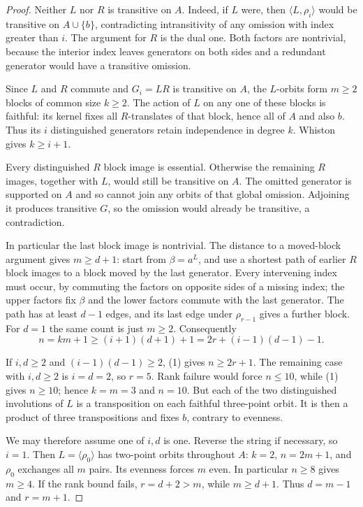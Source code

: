 \documentclass[11pt,a4paper]{article}
\newcommand{\gen}[1]{\langle#1\rangle}
\begin{document}
\begin{proof}
Neither $L$ nor $R$ is transitive on $A$. Indeed, if $L$ were,
then $\gen{L,\rho_i}$ would be transitive on $A\cup\{b\}$,
contradicting intransitivity of any omission with index greater
than $i$. The argument for $R$ is the dual one. Both factors
are nontrivial, because the interior index leaves generators
on both sides and a redundant generator would have a transitive
omission.

Since $L$ and $R$ commute and $G_i=LR$ is transitive on $A$,
the $L$-orbits form $m\geq2$ blocks of common size $k\geq2$.
The action of $L$ on any one of these blocks is faithful: its
kernel fixes all $R$-translates of that block, hence all of $A$
and also $b$. Thus its $i$ distinguished generators retain
independence in degree $k$. Whiston gives $k\geq i+1$.

Every distinguished $R$ block image is essential. Otherwise
the remaining $R$ images, together with $L$, would still be
transitive on $A$. The omitted generator is supported on $A$
and so cannot join any orbits of that global omission. Adjoining
it produces transitive $G$, so the omission would already be
transitive, a contradiction.

In particular the last block image is nontrivial. The distance
to a moved-block argument gives $m\geq d+1$: start from
$\beta=a^L$, and use a shortest path of earlier $R$ block
images to a block moved by the last generator. Every intervening
index must occur, by commuting the factors on opposite sides
of a missing index; the upper factors fix $\beta$ and the
lower factors commute with the last generator. The path has
at least $d-1$ edges, and its last edge under $\rho_{r-1}$
gives a further block. For $d=1$ the same count is just
$m\geq2$. Consequently
\[
 n=km+1\geq(i+1)(d+1)+1
          =2r+(i-1)(d-1)-1.                             \tag{1}
\]

If $i,d\geq2$ and $(i-1)(d-1)\geq2$, (1) gives $n\geq2r+1$.
The remaining case with $i,d\geq2$ is $i=d=2$, so $r=5$.
Rank failure would force $n\leq10$, while (1) gives $n\geq10$;
hence $k=m=3$ and $n=10$. But each of the two distinguished
involutions of $L$ is a transposition on each faithful
three-point orbit. It is then a product of three transpositions
and fixes $b$, contrary to evenness.

We may therefore assume one of $i,d$ is one. Reverse the string
if necessary, so $i=1$. Then $L=\gen{\rho_0}$ has two-point
orbits throughout $A$: $k=2$, $n=2m+1$, and $\rho_0$ exchanges
all $m$ pairs. Its evenness forces $m$ even. In particular
$n\geq8$ gives $m\geq4$.
If the rank bound fails, $r=d+2>m$, while $m\geq d+1$.
Thus $d=m-1$ and $r=m+1$.


\end{proof}
\end{document}
